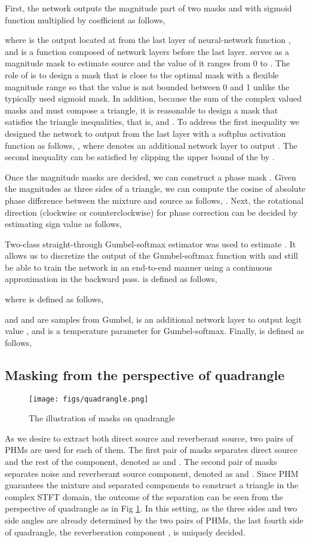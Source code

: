 \documentclass[a4paper]{article}
\begin{document}
First, the network outputs the magnitude part of two masks  and  with sigmoid function  multiplied by coefficient  as follows,

where  is the output located at  from the last layer of neural-network function , and  is a function composed of network layers before the last layer.
 serves as a magnitude mask to estimate source  and the value of it ranges from 0 to .
The role of  is to design a mask that is close to the optimal mask with a flexible magnitude range so that the value is not bounded between 0 and 1 unlike the typically used sigmoid mask.
In addition, because the sum of the complex valued masks  and  must compose a triangle, it is reasonable to design a mask that satisfies the triangle inequalities, that is,    and .
To address the first inequality we designed the network to output  from the last layer with a softplus activation function as follows, , where  denotes an additional network layer to output . The second inequality can be satisfied by clipping the upper bound of the  by .

Once the magnitude masks are decided, we can construct a phase mask . 
Given the magnitudes as three sides of a triangle, we can compute the cosine of absolute phase difference  between the mixture and source  as follows,
.
Next, the rotational direction (clockwise or counterclockwise) for phase correction can be decided by estimating sign value  as follows,

Two-class straight-through Gumbel-softmax estimator was used to estimate  \cite{jang2016categorical}. It allows us to discretize the output of the Gumbel-softmax function  with  and still be able to train the network in an end-to-end manner using a continuous approximation in the backward pass.
 is defined as follows,

where  is defined as follows,

and  and  are samples from Gumbel,  is an additional network layer to output logit value , and  is a temperature parameter for Gumbel-softmax.
Finally,  is defined as follows,


\subsection{Masking from the perspective of quadrangle}
\begin{figure}[htbp]
\centering
\texttt{[image: figs/quadrangle.png]}
\caption{The illustration of masks on quadrangle}
\label{fig:quadrangle}
\end{figure}
As we desire to extract both direct source and reverberant source, two pairs of PHMs are used for each of them.
The first pair of masks separates direct source and the rest of the component, denoted as  and .
The second pair of masks separates noise and reverberant source component, denoted as  and .
Since PHM guarantees the mixture and separated components to construct a triangle in the complex STFT domain, the outcome of the separation can be seen from the perspective of quadrangle as in Fig \ref{fig:quadrangle}.
In this setting, as the three sides and two side angles are already determined by the two pairs of PHMs, the last fourth side of quadrangle, the reverberation component , is uniquely decided.
\end{document}

